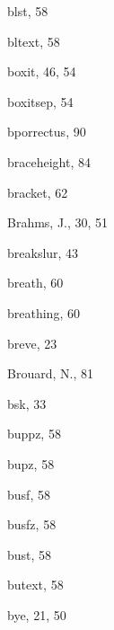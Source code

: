 \begin{theindex}
  \item {\Bslash blst}, 58
  \item {\Bslash bltext}, 58
  \item {\Bslash boxit}, 46, 54
  \item {\Bslash boxitsep}, 54
  \item {\Bslash bporrectus}, 90
  \item {\Bslash braceheight}, 84
  \item {\Bslash bracket}, 62
  \item {\sc Brahms, J.}, 30, 51
  \item {\Bslash breakslur}, 43
  \item {\Bslash breath}, 60
  \item breathing, 60
  \item {\Bslash breve}, 23
  \item {\sc Brouard, N.}, 81
  \item {\Bslash bsk}, 33
  \item {\Bslash buppz}, 58
  \item {\Bslash bupz}, 58
  \item {\Bslash busf}, 58
  \item {\Bslash busfz}, 58
  \item {\Bslash bust}, 58
  \item {\Bslash butext}, 58
  \item {\Bslash bye}, 21, 50

  \indexspace


\end{theindex}

